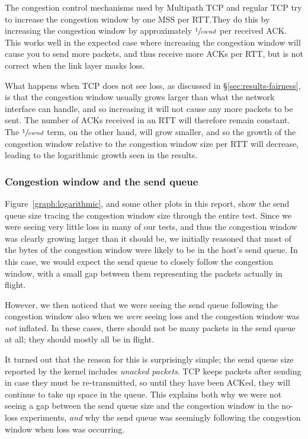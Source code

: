 The congestion control mechanisms used by Multipath TCP and regular TCP try to
increase the congestion window by one MSS per RTT.\@ They do this by increasing
the congestion window by approximately $\sfrac{1}{cwnd}$ per received ACK.\@
This works well in the expected case where increasing the congestion window will
cause you to send more packets, and thus receive more ACKs per RTT, but is not
correct when the link layer masks loss.

What happens when TCP does not see loss, as discussed in \S\ref{sec:results-fairness}, 
is that the congestion window usually grows larger than what the network 
interface can handle, and so increasing it will not cause any more packets to be 
sent. The number of ACKs received in an RTT will therefore remain constant. The 
$\sfrac{1}{cwnd}$ term, on the other hand, will grow smaller, and so the growth of the 
congestion window relative to the congestion window size per RTT will decrease, 
leading to the logarithmic growth seen in the results.

\subsubsection{Congestion window and the send queue}
\label{sec:closing:sendq}
Figure~\ref{graph:logarithmic}, and some other plots in this report, show the
send queue size tracing the congestion window size through the entire test.
Since we were seeing very little loss in many of our tests, and thus the
congestion window was clearly growing larger than it should be, we initially
reasoned that most of the bytes of the congestion window were likely to be in
the host's send queue. In this case, we would expect the send queue to closely
follow the congestion window, with a small gap between them representing the
packets actually in flight.

However, we then noticed that we were seeing the send queue following the
congestion window also when we \emph{were} seeing loss and the congestion
window was \emph{not} inflated. In these cases, there should not be many
packets in the send queue at all; they should mostly all be in flight.

It turned out that the reason for this is surprisingly simple; the send queue
size reported by the kernel includes \textit{unacked packets}. TCP keeps packets
after sending in case they must be re-transmitted, so until they have been
ACKed, they will continue to take up space in the queue. This explains both why
we were not seeing a gap between the send queue size and the congestion window
in the no-loss experiments, \emph{and} why the send queue was seemingly
following the congestion window when loss was occurring.

